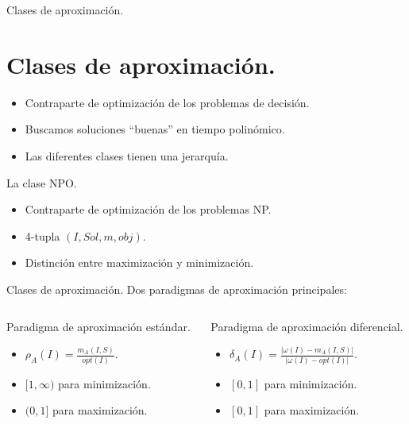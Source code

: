 \documentclass{beamer}
\begin{document}

\begin{frame}{Clases de aproximaci\'on.}

\section{Clases de aproximaci\'on.}

\begin{itemize}
\item Contraparte de optimizaci\'on de los problemas de decisi\'on.
\item Buscamos soluciones ``buenas'' en tiempo polin\'omico.
\item Las diferentes clases tienen una jerarqu\'ia.
\end{itemize}

\begin{block}{La clase NPO.}
\begin{itemize}
\item Contraparte de optimizaci\'on de los problemas NP.
\item 4-tupla $(I, Sol, m, obj)$.
\item Distinci\'on entre maximizaci\'on y minimizaci\'on.
\end{itemize}
\end{block}
    
\end{frame}

\begin{frame}{Clases de aproximaci\'on.}
Dos paradigmas de aproximaci\'on principales:

\begin{columns}[T]

\begin{column}{.46\textwidth}
\begin{block}{Paradigma de aproximaci\'on est\'andar.}
\begin{itemize}
\item $\rho_A(I)=\frac{m_A(I,S)}{opt(I)}$.
\item $[1,\infty)$ para minimizaci\'on.
\item $(0,1]$ para maximizaci\'on.
\end{itemize}
\end{block}
\end{column}

\begin{column}{.44\textwidth}
\begin{block}{Paradigma de aproximaci\'on diferencial.}
\begin{itemize}
\item $\delta_A(I)=\frac{|\omega(I)-m_A(I,S)|}{|\omega(I)-opt(I)|}$.
\item $[0,1]$ para minimizaci\'on.
\item $[0,1]$ para maximizaci\'on.
\end{itemize}
\end{block}
\end{column}
\end{columns}

\end{frame}
\end{document}
